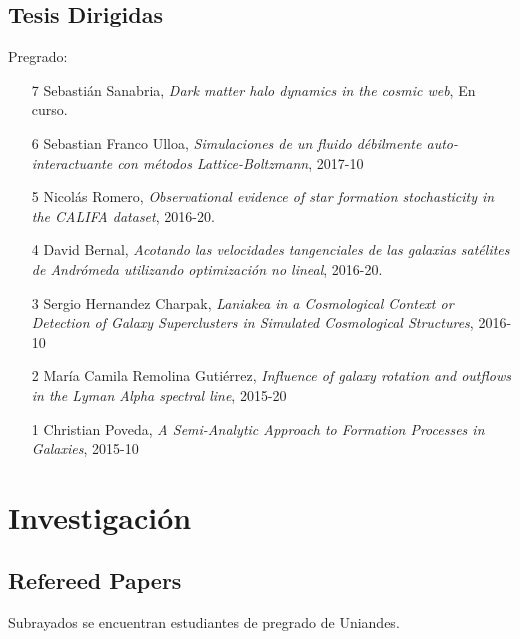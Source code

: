\documentclass{article}
\begin{document}
\subsection{Tesis Dirigidas}

Pregrado:
\begin{itemize}
\item [7] Sebasti\'an Sanabria, \emph{Dark matter halo dynamics in the
  cosmic web}, En curso.
\item [6] Sebastian Franco Ulloa, \emph{Simulaciones de un fluido
  débilmente auto-interactuante con métodos Lattice-Boltzmann},
  2017-10
\item [5] Nicol\'as Romero, \emph{Observational evidence of star formation
  stochasticity in the CALIFA dataset}, 2016-20.
\item [4] David Bernal, \emph{Acotando las velocidades tangenciales de las
  galaxias satélites de Andrómeda utilizando optimización no lineal}, 2016-20.
\item [3] Sergio Hernandez Charpak, \emph{Laniakea in a Cosmological
  Context or Detection of Galaxy Superclusters in Simulated
  Cosmological Structures}, 2016-10
\item [2] Mar\'ia Camila Remolina Guti\'errez, \emph{Influence of galaxy
  rotation and outflows in the Lyman Alpha spectral line}, 2015-20
\item [1] Christian Poveda, \emph{A Semi-Analytic Approach to Formation
  Processes in Galaxies}, 2015-10
\end{itemize}


\newpage
\section{Investigaci\'on}

\subsection{Refereed Papers}

Subrayados se encuentran estudiantes de pregrado de Uniandes.
\end{document}

